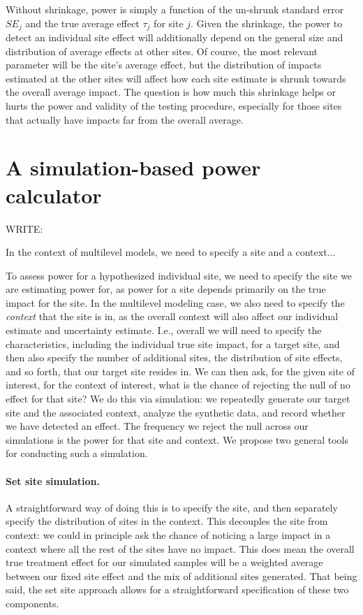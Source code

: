 \documentclass[]{article}
\begin{document}
Without shrinkage, power is simply a function of the un-shrunk standard error $SE_j$ and the true average effect $\tau_j$ for site $j$.
Given the shrinkage, the power to detect an individual site effect will additionally depend on the general size and distribution of average effects at other sites.
Of course, the most relevant parameter will be the site's average effect, but the distribution of impacts estimated at the other sites will affect how each site estimate is shrunk towards the overall average impact.
The question is how much this shrinkage helps or hurts the power and validity of the testing procedure, especially for those sites that actually have impacts far from the overall average.


\section{A simulation-based power calculator}

WRITE:

In the context of multilevel models, we need to specify a site and a context...




To assess power for a hypothesized individual site, we need to specify the site we are estimating power for, as power for a site depends primarily on the true impact for the site.
In the multilevel modeling case, we also need to specify the \emph{context} that the site is in, as the overall context will also affect our individual estimate and uncertainty estimate.
I.e., overall we will need to specify the characteristics, including the individual true site impact, for a target site, and then also specify the number of additional sites, the distribution of site effects, and so forth, that our target site resides in.
We can then ask, for the given site of interest, for the context of interest, what is the chance of rejecting the null of no effect for that site?
We do this via simulation: we repeatedly generate our target site and the associated context, analyze the synthetic data, and record whether we have detected an effect.
The frequency we reject the null across our simulations is the power for that site and context.
We propose two general tools for conducting such a simulation.


\paragraph{Set site simulation.} A straightforward way of doing this is to specify the site, and then separately specify the distribution of sites in the context.
This decouples the site from context: we could in principle ask the chance of noticing a large impact in a context where all the rest of the sites have no impact.
This does mean the overall true treatment effect for our simulated samples will be a weighted average between our fixed site effect and the mix of additional sites generated.
That being said, the set site approach allows for a straightforward specification of these two components.
\end{document}
